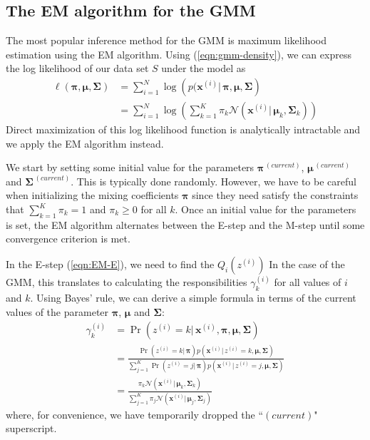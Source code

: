 \documentclass[final,3p,times,twocolumn]{elsarticle}
\let\bs\boldsymbol
\begin{document}
\subsection{The EM algorithm for the GMM}
The most popular inference method for the GMM is maximum likelihood estimation using the EM algorithm.
Using (\ref{eqn:gmm-density}), we can express the log likelihood of our data set $S$ under the model as
\begin{equation}
\label{eqn:gmmlogLikelihood}
\begin{split}
\ell(\bs\pi,\bs\mu,\bs\Sigma) &= \sum_{i=1}^N \log \left(p(\bs x^{(i)}|\,\bs\pi,\bs\mu,\bs\Sigma\right)\\
&= \sum_{i=1}^N \log \left(\sum_{k=1}^K \pi_k \mathcal{N}(\bs x^{(i)}|\,\bs\mu_k,\bs\Sigma_k)\right)
\end{split}
\end{equation}
Direct maximization of this log likelihood function is analytically intractable and we apply the EM algorithm instead.

We start by setting some initial value for the parameters $\bs\pi^{\,(current)}$, $\bs\mu^{\,(current)}$ and $\bs\Sigma^{\,(current)}$.
This is typically done randomly.
However, we have to be careful when initializing the mixing coefficients $\bs\pi$ since they need satisfy the constraints that $\sum_{k=1}^K \pi_k = 1$ and $\pi_k \geq 0$ for all $k$.
Once an initial value for the parameters is set, the EM algorithm alternates between the E-step and the M-step until some convergence criterion is met.

In the E-step (\ref{eqn:EM-E}), we need to find the $Q_i(z^{(i)})$
In the case of the GMM, this translates to calculating the responsibilities $\gamma_k^{(i)}$ for all values of $i$ and $k$.
Using Bayes' rule, we can derive a simple formula in terms of the current values of the parameter $\bs\pi$, $\bs\mu$ and $\bs\Sigma$:
\begin{equation}
\label{eqn:gmmresponsibility}
\begin{split}
\gamma_k^{(i)} &= \Pr(z^{(i)}=k|\,\bs x^{(i)},\bs\pi,\bs\mu,\bs\Sigma)\\
&= \frac{\Pr(z^{(i)}=k|\,\bs\pi)p(\bs x^{(i)}|\,z^{(i)}=k,\bs\mu,\bs\Sigma)}{\sum_{j=1}^K \Pr(z^{(i)}=j|\,\bs\pi)p(\bs x^{(i)}|\,z^{(i)}=j,\bs\mu,\bs\Sigma)}\\
&= \frac{\pi_k\mathcal{N}(\bs x^{(i)}|\,\bs\mu_k,\bs\Sigma_k)}{\sum_{j=1}^K \pi_j\mathcal{N}(\bs x^{(i)}|\,\bs\mu_j,\bs\Sigma_j)}
\end{split}
\end{equation}
where, for convenience, we have temporarily dropped the ``$(current)$" superscript.
\end{document}
